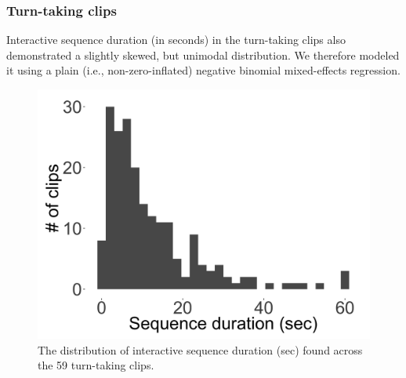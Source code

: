 \documentclass[floatsintext,man]{apa6}
\theoremstyle{definition}
\theoremstyle{definition}
\theoremstyle{definition}
\theoremstyle{remark}
\begin{document}
\FloatBarrier

\subsubsection{Turn-taking clips}\label{models-seqdur-turntaking}

Interactive sequence duration (in seconds) in the turn-taking clips also
demonstrated a slightly skewed, but unimodal distribution. We therefore
modeled it using a plain (i.e., non-zero-inflated) negative binomial
mixed-effects regression.

\FloatBarrier

\begin{figure}[H]

{\centering \includegraphics[width=0.4\linewidth]{www/seqdur_turntaking_distribution} 

}

\caption{The distribution of interactive sequence duration (sec) found across the 59 turn-taking clips.}\label{fig:fig28}
\end{figure}

\FloatBarrier
\end{document}
